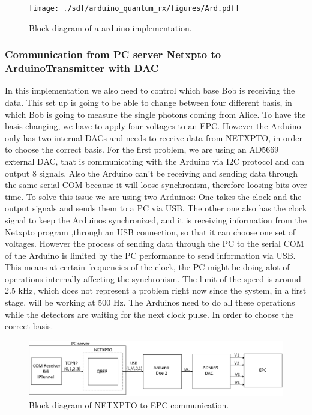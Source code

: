 \begin{refsection}
	\begin{figure}[H] 
		\centering
		\texttt{[image: ./sdf/arduino\_quantum\_rx/figures/Ard.pdf]}
		\caption{Block diagram of a arduino implementation.}
		\label{fig:netxpto}
		
	\end{figure}

	\subsubsection{Communication from PC server Netxpto to ArduinoTransmitter with DAC}
	In this implementation we also need to control which base Bob is receiving the data. This set up is going to be able to change between four different basis, in which Bob is going to measure the single photons coming from Alice. To have the basis changing, we have to apply four voltages to an EPC. However the Arduino only has two internal DACs and needs to receive data from NETXPTO, in order to choose the correct basis. For the first problem, we are using an AD5669 external DAC, that is communicating with the Arduino via I2C protocol and can output 8 signals. Also the Arduino can't be receiving and sending data through the same serial COM because it will loose synchronism, therefore loosing bits over time. To solve this issue we are using two Arduinos: One takes the clock and the output signals and sends them to a PC via USB. The other one also has the clock signal to keep the Arduinos synchronized, and it is receiving information from the Netxpto program ,through an USB connection, so that it can choose one set of voltages. However the process of sending data through the PC to the serial COM of the Arduino is limited by the PC performance to send information via USB. This means at certain frequencies of the clock, the PC might be doing alot of operations internally affecting the synchronism. The limit of the speed is around 2.5 kHz, which does not represent a problem right now since the system, in a first stage, will be working at 500 Hz. The Arduinos need to do all these operations while the detectors are waiting for the next clock pulse. In order to choose the correct basis.
	
	\begin{figure}[H]
		
		\centering
		\includegraphics[width=1\linewidth]{./sdf/arduino_quantum_rx/figures/DAC.png}
		\caption{Block diagram of NETXPTO to EPC communication.}
		\label{fig:netxpto}


\end{figure}
\end{refsection}
